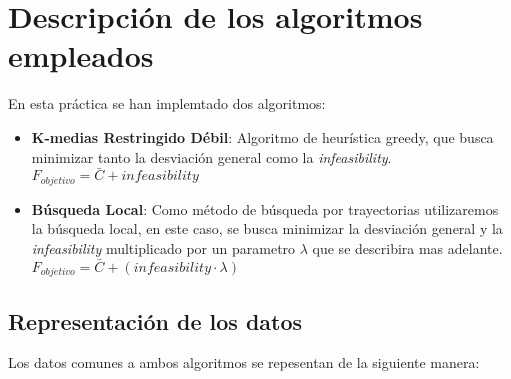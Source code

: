 \section{Descripción de los algoritmos empleados}

En esta práctica se han implemtado dos algoritmos:
\begin{itemize}
   \item \textbf{K-medias Restringido Débil}: Algoritmo de heurística greedy, que busca minimizar tanto la desviación general como la \emph{infeasibility}. $ F_{objetivo} = \bar{C} + infeasibility $
   \item \textbf{Búsqueda Local}: Como método de búsqueda por trayectorias utilizaremos la búsqueda local, en este caso, se busca minimizar la desviación general y la \emph{infeasibility} multiplicado por un parametro $ \lambda $ que se describira mas adelante. $ F_{objetivo} = \bar{C} + (infeasibility \cdot \lambda) $
\end{itemize}

\subsection{Representación de los datos}
Los datos comunes a ambos algoritmos se repesentan de la siguiente manera:





